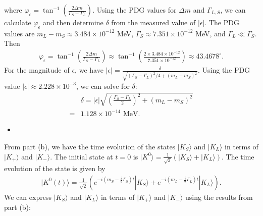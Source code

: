 where $\varphi_\epsilon = \tan^{-1}\left(\frac{2\Delta m}{\Gamma_S - \Gamma_L}\right)$. Using the PDG values for $\Delta m$ and $\Gamma_{L,S}$, we can calculate $\varphi_\epsilon$ and then determine $\delta$ from the measured value of $|\epsilon|$. The PDG values are $m_L-m_S \approx 3.484 \times 10^{-12}$ MeV, $\Gamma_S \approx 7.351 \times 10^{-12}$ MeV, and $\Gamma_L\ll \Gamma_S$. Then 
\begin{align}
    \varphi_\epsilon = \tan^{-1}\left(\frac{2\Delta m}{\Gamma_S - \Gamma_L}\right) \approx \tan^{-1}\left(\frac{2 \times 3.484 \times 10^{-12}}{7.351 \times 10^{-12}}\right) \approx 43.4678^\circ.
\end{align}
For the magnitude of $\epsilon$, we have $|\epsilon| = \frac{\delta}{\sqrt{(\Gamma_S-\Gamma_L)^2/4 + (m_L - m_S)^2}}$. Using the PDG value $|\epsilon| \approx 2.228 \times 10^{-3}$, we can solve for $\delta$:
\begin{align}
    &\delta = |\epsilon| \sqrt{\left(\frac{\Gamma_S - \Gamma_L}{2}\right)^2 + (m_L - m_S)^2} \\
    =&1.128 \times 10^{-14} \text{ MeV}.
\end{align}
\begin{itemize}
    \item [(c)]
\end{itemize}
From part (b), we have the time evolution of the states $|K_S\rangle$ and $|K_L\rangle$ in terms of $|K_+\rangle$ and $|K_-\rangle$. The initial state at $t=0$ is $|K^0\rangle = \frac{1}{\sqrt{2}}(|K_S\rangle + |K_L\rangle)$. The time evolution of the state is given by
\begin{align}
    |K^0(t)\rangle = \frac{1}{\sqrt{2}}(e^{-i(m_S - \frac{i}{2}\Gamma_S)t}|K_S\rangle + e^{-i(m_L - \frac{i}{2}\Gamma_L)t}|K_L\rangle).
\end{align}
We can express $|K_S\rangle$ and $|K_L\rangle$ in terms of $|K_+\rangle$ and $|K_-\rangle$ using the results from part (b):
